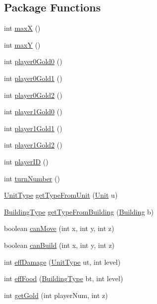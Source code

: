 \subsection*{Package Functions}
\begin{CompactItemize}
\item 
int \hyperlink{classBaseAI_e7574c0a95bc4431f83078c0074b1eec}{maxX} ()
\item 
int \hyperlink{classBaseAI_68f5dfd6450be2649c8c26481ba7c0a5}{maxY} ()
\item 
int \hyperlink{classBaseAI_e350c70cf7c368175a418a8fd8c29eba}{player0Gold0} ()
\item 
int \hyperlink{classBaseAI_55de649fba1edb2c8a316070a4041f16}{player0Gold1} ()
\item 
int \hyperlink{classBaseAI_5ea60d2c86f1e4457bef7963a3d0afce}{player0Gold2} ()
\item 
int \hyperlink{classBaseAI_f82cc7bd092d0636eb8a8df82a0c5b49}{player1Gold0} ()
\item 
int \hyperlink{classBaseAI_cc09926bd744fdf9ec4448366d8b8de7}{player1Gold1} ()
\item 
int \hyperlink{classBaseAI_35bad13d289478aa2bb628d6e3c56c52}{player1Gold2} ()
\item 
int \hyperlink{classBaseAI_16aab1036653c8f8fb5370cf2f6a3e10}{playerID} ()
\item 
int \hyperlink{classBaseAI_19ade7391bfe101884a35f48fb840199}{turnNumber} ()
\item 
\hyperlink{classUnitType}{UnitType} \hyperlink{classBaseAI_9bd3c6a1259db084fa6780d50bea95eb}{getTypeFromUnit} (\hyperlink{classUnit}{Unit} u)
\item 
\hyperlink{classBuildingType}{BuildingType} \hyperlink{classBaseAI_ca41bf18cdb670b9bcc5fe92eae198ad}{getTypeFromBuilding} (\hyperlink{classBuilding}{Building} b)
\item 
boolean \hyperlink{classBaseAI_2c7a4223bdc14056161c650c218369b3}{canMove} (int x, int y, int z)
\item 
boolean \hyperlink{classBaseAI_fcd72f9782c984b69f60db45756d73c4}{canBuild} (int x, int y, int z)
\item 
int \hyperlink{classBaseAI_0643622ad827a6ad035bf84dfdfacd55}{effDamage} (\hyperlink{classUnitType}{UnitType} ut, int level)
\item 
int \hyperlink{classBaseAI_ec102e33572b1f58df437260bf73141e}{effFood} (\hyperlink{classBuildingType}{BuildingType} bt, int level)
\item 
int \hyperlink{classBaseAI_c079405ee4fd5cec789af0f627d3d175}{getGold} (int playerNum, int z)

\end{CompactItemize}
